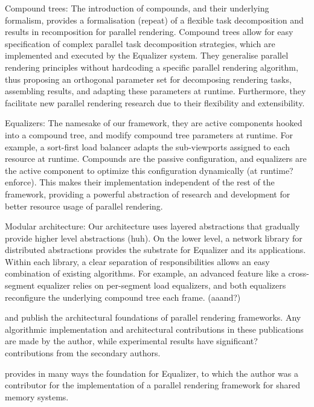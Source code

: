\begin{compactdesc}
\item[Compound trees:] The introduction of compounds, and their underlying
formalism, provides a formalisation (repeat) of a flexible task decomposition and results in
recomposition for parallel rendering. Compound trees allow for easy
specification of complex parallel task decomposition strategies, which are
implemented and executed by the Equalizer system. They generalise parallel
rendering principles without hardcoding a specific parallel rendering
algorithm, thus proposing an orthogonal parameter set for decomposing rendering
tasks, assembling results, and adapting these parameters at runtime.
Furthermore, they facilitate new parallel rendering research due to their
flexibility and extensibility.

\item[Equalizers:] The namesake of our framework, they are active components
hooked into a compound tree, and modify compound tree parameters at runtime.
For example, a sort-first load balancer adapts the sub-viewports assigned to
each resource at runtime. Compounds are the passive configuration, and
equalizers are the active component to optimize this configuration dynamically (at runtime? enforce).
This makes their implementation independent of the rest of the framework,
providing a powerful abstraction of research and development for better
resource usage of parallel rendering.

\item[Modular architecture:] Our architecture uses layered abstractions that
gradually provide higher level abstractions (huh). On the lower level, a network
library for distributed abstractions provides the substrate for Equalizer and its
applications. Within each library, a clear separation of responsibilities
allows an easy combination of existing algorithms. For example, an advanced feature
like a cross-segment equalizer relies on per-segment load equalizers, and
both equalizers reconfigure the underlying compound tree each frame. (aaand?)

\end{compactdesc}

\cite{EMP:09} and \cite{ESP:18} publish the architectural foundations of
parallel rendering frameworks. Any algorithmic implementation and
architectural contributions in these publications are made by the
author, while experimental results have significant? contributions from the
secondary authors.

\cite{BRE:05} provides in many ways the foundation for Equalizer, to which the
author was a contributor for the implementation of a parallel rendering
framework for shared memory systems.

